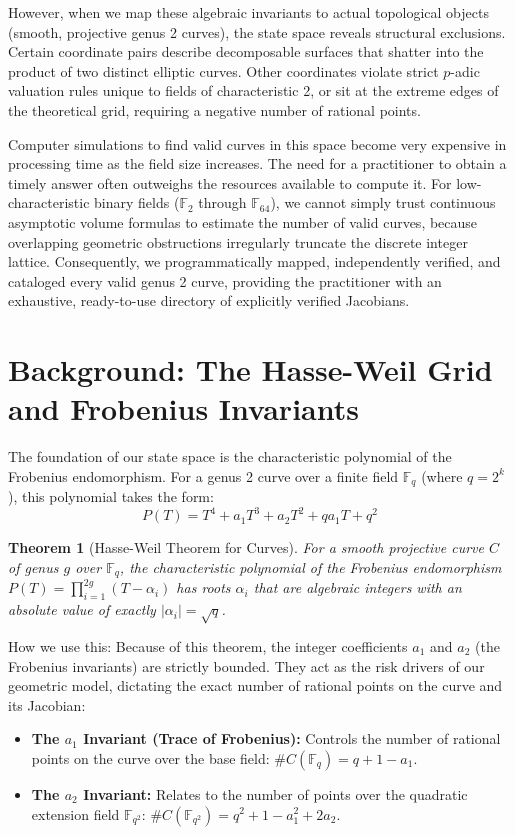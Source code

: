\documentclass[letterpaper, 11pt]{article}
\newtheorem{theorem}{Theorem}[section]
\begin{document}
However, when we map these algebraic invariants to actual topological objects (smooth, projective genus 2 curves), the state space reveals structural exclusions. Certain coordinate pairs describe decomposable surfaces that shatter into the product of two distinct elliptic curves. Other coordinates violate strict $p$-adic valuation rules unique to fields of characteristic 2, or sit at the extreme edges of the theoretical grid, requiring a negative number of rational points.

Computer simulations to find valid curves in this space become very expensive in processing time as the field size increases. The need for a practitioner to obtain a timely answer often outweighs the resources available to compute it. For low-characteristic binary fields ($\mathbb{F}_2$ through $\mathbb{F}_{64}$), we cannot simply trust continuous asymptotic volume formulas to estimate the number of valid curves, because overlapping geometric obstructions irregularly truncate the discrete integer lattice. Consequently, we programmatically mapped, independently verified, and cataloged every valid genus 2 curve, providing the practitioner with an exhaustive, ready-to-use directory of explicitly verified Jacobians.

\section{Background: The Hasse-Weil Grid and Frobenius Invariants}
The foundation of our state space is the characteristic polynomial of the Frobenius endomorphism. For a genus 2 curve over a finite field $\mathbb{F}_q$ (where $q = 2^k$), this polynomial takes the form:
\[ P(T) = T^4 + a_1 T^3 + a_2 T^2 + q a_1 T + q^2 \]

\begin{theorem}[Hasse-Weil Theorem for Curves]
For a smooth projective curve $C$ of genus $g$ over $\mathbb{F}_q$, the characteristic polynomial of the Frobenius endomorphism $P(T) = \prod_{i=1}^{2g} (T - \alpha_i)$ has roots $\alpha_i$ that are algebraic integers with an absolute value of exactly $|\alpha_i| = \sqrt{q}$.
\end{theorem}

How we use this: Because of this theorem, the integer coefficients $a_1$ and $a_2$ (the Frobenius invariants) are strictly bounded. They act as the risk drivers of our geometric model, dictating the exact number of rational points on the curve and its Jacobian:
\begin{itemize}
    \item \textbf{The $a_1$ Invariant (Trace of Frobenius):} Controls the number of rational points on the curve over the base field: $\#C(\mathbb{F}_q) = q + 1 - a_1$.
    \item \textbf{The $a_2$ Invariant:} Relates to the number of points over the quadratic extension field $\mathbb{F}_{q^2}$: $\#C(\mathbb{F}_{q^2}) = q^2 + 1 - a_1^2 + 2a_2$.
\end{itemize}
\end{document}
